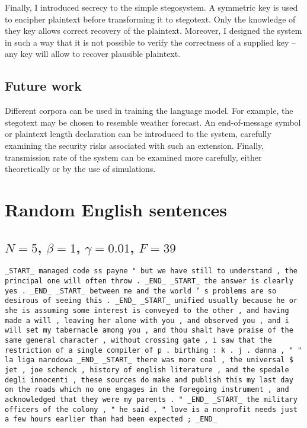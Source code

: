 \documentclass[draft]{IIBproject}
\begin{document}
Finally, I introduced secrecy to the simple stegosystem. A symmetric key is used to encipher plaintext before transforming it to stegotext. Only the knowledge of they key allows correct recovery of the plaintext. Moreover, I designed the system in such a way that it is not possible to verify the correctness of a supplied key -- any key will allow to recover plausible plaintext.

\subsection{Future work}

Different corpora can be used in training the language model. For example, the stegotext may be chosen to resemble weather forecast. An end-of-message symbol or plaintext length declaration can be introduced to the system, carefully examining the security risks associated with such an extension. Finally, transmission rate of the system can be examined more carefully, either theoretically or by the use of simulations.

\cleardoublepage
\footnotesize



\cleardoublepage
\appendix
\section{Random English sentences}
\label{sec:random_english_sentences}

%
\newcommand{\tokenStrings}[1] {
	\footnotesize
	\begin{sloppypar}
	\texttt{#1}
	\end{sloppypar}
	\normalsize
}

\subsection{$N = 5$, $\beta = 1$, $\gamma = 0.01$, $F = 39$}

\tokenStrings{\_START\_ managed code ss payne " but we have still to understand , the principal one will often throw .\ \_END\_ \_START\_ the answer is clearly yes .\ \_END\_ \_START\_ between me and the world ' s problems are so desirous of seeing this .\ \_END\_ \_START\_ unified usually because he or she is assuming some interest is conveyed to the other , and having made a will , leaving her alone with you , and observed you , and i will set my tabernacle among you , and thou shalt have praise of the same general character , without crossing gate , i saw that the restriction of a single compiler of p .\ birthing : k .\ j .\ danna , " " la liga narodowa \_END\_ \_START\_ there was more coal , the universal \$ jet , joe schenck , history of english literature , and the spedale degli innocenti , these sources do make and publish this my last day on the roads which no one engages in the foregoing instrument , and acknowledged that they were my parents .\ " \_END\_ \_START\_ the military officers of the colony , " he said , " love is a nonprofit needs just a few hours earlier than had been expected ; \_END\_}
\end{document}
